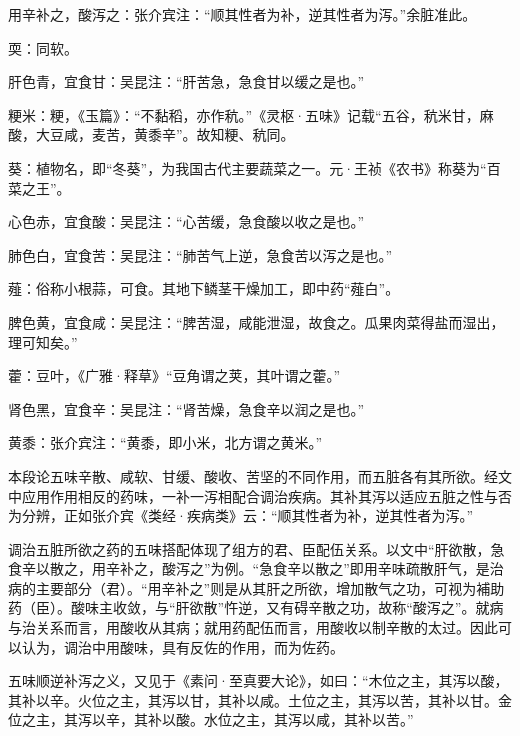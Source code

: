 \documentclass[draft,12pt]{ctexbook}
\begin{document}

\begin{jiaozhu}
	\item 用辛补之，酸泻之：张介宾注：“顺其性者为补，逆其性者为泻。”余脏准此。
	\item 耎：同软。
	\item 肝色青，宜食甘：吴昆注：“肝苦急，急食甘以缓之是也。”
	\item 粳米：粳，《玉篇》：“不黏稻，亦作秔。”《灵枢·五味》记载“五谷，秔米甘，麻酸，大豆咸，麦苦，黄黍辛”。故知粳、秔同。
	\item 葵：植物名，即“冬葵”，为我国古代主要蔬菜之一。元·王祯《农书》称葵为“百菜之王”。
	\item 心色赤，宜食酸：吴昆注：“心苦缓，急食酸以收之是也。”
	\item 肺色白，宜食苦：吴昆注：“肺苦气上逆，急食苦以泻之是也。”
	\item 薤：俗称小根蒜，可食。其地下鳞茎干燥加工，即中药“薤白”。
	\item 脾色黄，宜食咸：吴昆注：“脾苦湿，咸能泄湿，故食之。瓜果肉菜得盐而湿出，理可知矣。”
	\item 藿：豆叶，《广雅·释草》“豆角谓之荚，其叶谓之藿。”
	\item 肾色黑，宜食辛：吴昆注：“肾苦燥，急食辛以润之是也。”
	\item 黄黍：张介宾注：“黄黍，即小米，北方谓之黄米。”
\end{jiaozhu}



本段论五味辛散、咸软、甘缓、酸收、苦坚的不同作用，而五脏各有其所欲。经文中应用作用相反的药味，一补一泻相配合调治疾病。其补其泻以适应五脏之性与否为分辨，正如张介宾《类经·疾病类》云：“顺其性者为补，逆其性者为泻。”

调治五脏所欲之药的五味搭配体现了组方的君、臣配伍关系。以文中“肝欲散，急食辛以散之，用辛补之，酸泻之”为例。“急食辛以散之”即用辛味疏散肝气，是治病的主要部分（君）。“用辛补之”则是从其肝之所欲，增加散气之功，可视为補助药（臣）。酸味主收敛，与“肝欲散”忤逆，又有碍辛散之功，故称“酸泻之”。就病与治关系而言，用酸收从其病；就用药配伍而言，用酸收以制辛散的太过。因此可以认为，调治中用酸味，具有反佐的作用，而为佐药。

五味顺逆补泻之义，又见于《素问·至真要大论》，如曰：“木位之主，其泻以酸，其补以辛。火位之主，其泻以甘，其补以咸。土位之主，其泻以苦，其补以甘。金位之主，其泻以辛，其补以酸。水位之主，其泻以咸，其补以苦。”

\end{document}
